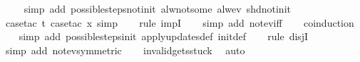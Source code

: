 \begin{isabellebody}
\ \ \ \isamarkupfalse%
\ {\isacharparenleft}simp\ add{\isacharcolon}\ possible{\isacharunderscore}steps{\isacharunderscore}not{\isacharunderscore}init\ alw{\isacharunderscore}not{\isacharunderscore}some\ alw{\isacharunderscore}ev\ shd{\isacharunderscore}not{\isacharunderscore}init{\isacharparenright}\isanewline
\ \ \isamarkupfalse%
\ {\isacharparenleft}case{\isacharunderscore}tac\ t{\isacharcomma}\ case{\isacharunderscore}tac\ x{}{\isacharcomma}\ simp{\isacharparenright}\isanewline
\ \ \isamarkupfalse%
\ {\isacharparenleft}rule\ impI{\isacharparenright}\isanewline
\ \ \isamarkupfalse%
\ {\isacharparenleft}simp\ add{\isacharcolon}\ not{\isacharunderscore}ev{\isacharunderscore}iff{\isacharparenright}\isanewline
\ \ \isamarkupfalse%
\ {\isacharparenleft}coinduction{\isacharparenright}\isanewline
\ \ \isamarkupfalse%
\ {\isacharparenleft}simp\ add{\isacharcolon}\ possible{\isacharunderscore}steps{\isacharunderscore}init\ apply{\isacharunderscore}updates{\isacharunderscore}def\ init{\isacharunderscore}def{\isacharparenright}\isanewline
\ \ \isamarkupfalse%
\ {\isacharparenleft}rule\ disjI{}{\isacharparenright}\isanewline
\ \ \isamarkupfalse%
\ {\isacharparenleft}simp\ add{\isacharcolon}\ not{\isacharunderscore}ev{\isacharbrackleft}symmetric{\isacharbrackright}{\isacharparenright}\isanewline
\ \ \isamarkupfalse%
\ invalid{\isacharunderscore}gets{\isacharunderscore}stuck\ \isamarkupfalse%
\ auto%
\endisatagproof
{\isafoldproof}%
%
\isadelimproof
%
\endisadelimproof
%
\end{isabellebody}

